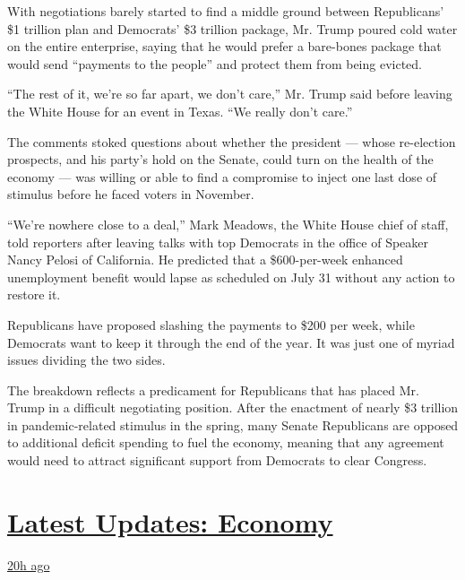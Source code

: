 With negotiations barely started to find a middle ground between
Republicans' \$1 trillion plan and Democrats' \$3 trillion package, Mr.
Trump poured cold water on the entire enterprise, saying that he would
prefer a bare-bones package that would send ``payments to the people''
and protect them from being evicted.

``The rest of it, we're so far apart, we don't care,'' Mr. Trump said
before leaving the White House for an event in Texas. ``We really don't
care.''

The comments stoked questions about whether the president --- whose
re-election prospects, and his party's hold on the Senate, could turn on
the health of the economy --- was willing or able to find a compromise
to inject one last dose of stimulus before he faced voters in November.

``We're nowhere close to a deal,'' Mark Meadows, the White House chief
of staff, told reporters after leaving talks with top Democrats in the
office of Speaker Nancy Pelosi of California. He predicted that a
\$600-per-week enhanced unemployment benefit would lapse as scheduled on
July 31 without any action to restore it.

Republicans have proposed slashing the payments to \$200 per week, while
Democrats want to keep it through the end of the year. It was just one
of myriad issues dividing the two sides.

The breakdown reflects a predicament for Republicans that has placed Mr.
Trump in a difficult negotiating position. After the enactment of nearly
\$3 trillion in pandemic-related stimulus in the spring, many Senate
Republicans are opposed to additional deficit spending to fuel the
economy, meaning that any agreement would need to attract significant
support from Democrats to clear Congress.

\hypertarget{latest-updates-economy}{%
\section{\texorpdfstring{\href{https://www.nytimes3xbfgragh.onion/live/2020/07/31/business/stock-market-today-coronavirus?action=click\&pgtype=Article\&state=default\&region=MAIN_CONTENT_1\&context=storylines_live_updates}{Latest
Updates:
Economy}}{Latest Updates: Economy}}\label{latest-updates-economy}}

\href{https://www.nytimes3xbfgragh.onion/live/2020/07/31/business/stock-market-today-coronavirus?action=click\&pgtype=Article\&state=default\&region=MAIN_CONTENT_1\&context=storylines_live_updates\#kodaks-chief-executive-was-given-stock-options-then-the-share-price-spiked-1000-percent}{20h
ago}


